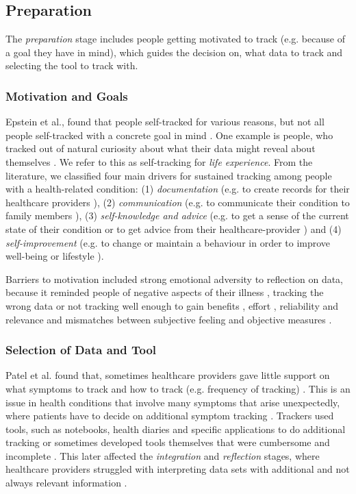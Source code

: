 \subsection{Preparation} 
The \textit{preparation} stage includes people getting motivated to track (e.g. because of a goal they have in mind), which guides the decision on, what data to track and selecting the tool to track with. 

\subsubsection{Motivation and Goals} 
Epstein et al., found that people self-tracked for various reasons, but not all people self-tracked with a concrete goal in mind \cite{Epstein2015}. One example is people, who tracked out of natural curiosity about what their data might reveal about themselves \cite{Li2010, Epstein2015}. We refer to this as self-tracking for \textit{life experience}. From the literature, we classified four main drivers for sustained tracking among people with a health-related condition: (1) \textit{documentation} (e.g. to create records for their healthcare providers \cite{Ancker2015}), (2) \textit{communication} (e.g. to communicate their condition to family members \cite{MacLeod2014}), (3) \textit{self-knowledge and advice} (e.g. to get a sense of the current state of their condition or to get advice from their healthcare-provider \cite{MacLeod2014, Ancker2015}) and (4) \textit{self-improvement} (e.g. to change or maintain a behaviour in order to improve well-being or lifestyle \cite{MacLeod2014, Ancker2015, Chung2016}).

Barriers to motivation included strong emotional adversity to reflection on data, because it reminded people of negative aspects of their illness \cite{Li2010, Ancker2015}, tracking the wrong data or not tracking well enough to gain benefits \cite{Chung2015}, effort \cite{Choe2014, Patel2012}, reliability and relevance \cite{Oh2015, piloting, Epstein2015} and mismatches between subjective feeling and objective measures \cite{Ancker2015}. 

\subsubsection{Selection of Data and Tool} 
Patel et al. found that, sometimes healthcare providers gave little support on what symptoms to track and how to track (e.g. frequency of tracking) \cite{Patel2012}. This is an issue in health conditions that involve many symptoms that arise unexpectedly, where patients have to decide on additional symptom tracking \cite{Patel2012, Chung2016}. Trackers used tools, such as notebooks, health diaries and specific applications to do additional tracking or sometimes developed tools themselves that were cumbersome and incomplete \cite{Patel2012}. This later affected the \textit{integration} and \textit{reflection} stages, where healthcare providers struggled with interpreting data sets with additional and not always relevant information \cite{Chung2015, Chung2016}.

